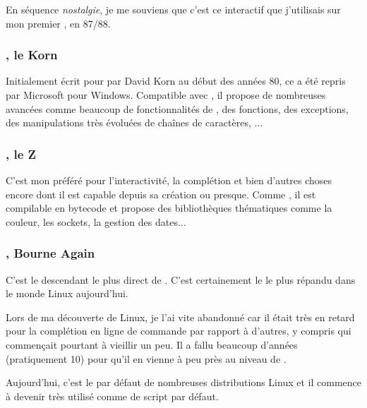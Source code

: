 En séquence \emph{nostalgie}, je me souviens que c'est ce \shell{} interactif que j'utilisais sur mon premier \unix{}, en 87/88.

\subsubsection{\ksh{}, le Korn  \shell{}}
Initialement écrit pour \unix{} par David Korn au début des années 80, ce \shell{} a été repris par Microsoft pour Windows. Compatible avec \sh{}, il propose de nombreuses avancées comme beaucoup de fonctionnalités de \tcsh{},  des fonctions, des exceptions, des manipulations très évoluées de chaînes de caractères, ...

\subsubsection{\zsh{}, le Z  \shell{}}
C'est mon préféré pour l'interactivité, la complétion et bien d'autres choses encore dont il est capable depuis sa création ou presque. Comme \ksh{}, il est compilable en bytecode et propose des bibliothèques thématiques comme la couleur, les sockets, la gestion des dates...

\subsubsection{\bash{}, Bourne Again  \shell{}}
C'est le descendant le plus direct de \sh{}. C'est certainement le \shell{} le plus répandu dans le monde Linux aujourd'hui. 

Lors de ma découverte de Linux, je l'ai vite abandonné car il était très en retard pour la complétion en ligne de commande par rapport à d'autres, y compris \tcsh{} qui commençait pourtant à vieillir un peu. Il a fallu beaucoup d'années (pratiquement 10) pour qu'il en vienne à peu près au niveau de \zsh{}.

Aujourd'hui, c'est le \shell{} par défaut de nombreuses distributions Linux et il commence à devenir très utilisé comme \shell{} de script par défaut. 

